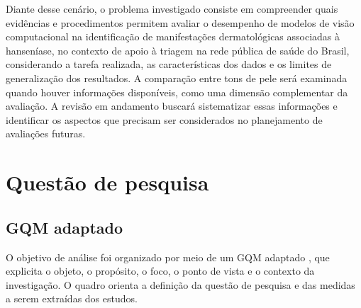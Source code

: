 Diante desse cenário, o problema investigado consiste em compreender
quais evidências e procedimentos permitem avaliar o desempenho de
modelos de visão computacional na identificação de manifestações
dermatológicas associadas à hanseníase, no contexto de apoio à triagem
na rede pública de saúde do Brasil, considerando a tarefa realizada, as
características dos dados e os limites de generalização dos resultados.
A comparação entre tons de pele será examinada quando houver informações
disponíveis, como uma dimensão complementar da avaliação. A revisão em
andamento buscará sistematizar essas informações e identificar os
aspectos que precisam ser considerados no planejamento de avaliações
futuras.

\section{Questão de pesquisa}\label{gqm-adaptado-e-questuxe3o-de-pesquisa}

\subsection{GQM adaptado}

O objetivo de análise foi organizado por meio de um GQM adaptado
\cite{basili1994,wohlin2024}, que
explicita o objeto, o propósito, o foco, o ponto de vista e o contexto
da investigação. O quadro orienta a definição da questão de pesquisa e
das medidas a serem extraídas dos estudos.

